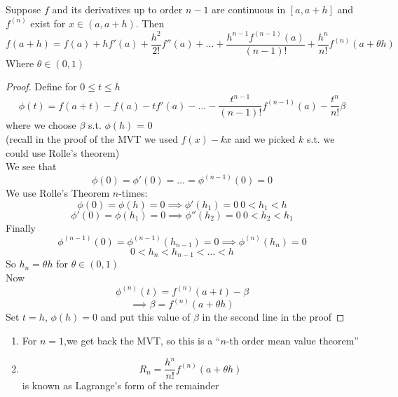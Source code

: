 \begin{theorem}
Suppose $f$ and its derivatives up to order $n-1$ are continuous in $[a,a+h]$ and $f^{(n)}$ exist for $x\in (a,a+h)$. Then
\[f(a+h) = f(a) + hf'(a) + \frac{h^2}{2!}f''(a) + \dots + \frac{h^{n-1}f^{(n-1)}(a)}{(n-1)!} + \frac{h^n}{n!}f^{(n)}(a+\theta h)\]
Where $\theta \in (0,1)$
\begin{proof}
Define for $0\leq t\leq h$
\[\phi(t) = f(a+t) - f(a)-tf'(a)-\dots - \frac{t^{n-1}}{(n-1)!}f^{(n-1)}(a) - \frac{t^n}{n!}\beta\]
where we choose $\beta$ s.t. $\phi(h)$ = 0\\
(recall in the proof of the MVT we used $f(x) - kx$ and we picked $k$ s.t. we could use Rolle's theorem)\\
We see that
\[\phi(0) = \phi'(0) = \dots = \phi^{(n-1)}(0) = 0\]
We use Rolle's Theorem $n$-times:
\[\phi(0) = \phi(h) = 0 \implies\phi'(h_1) = 0 \ 0<h_1<h\]
\[\phi'(0) = \phi(h_1) = 0 \implies\phi''(h_2) = 0 \ 0<h_2<h_1\]
Finally
\[\phi^{(n-1)}(0) = \phi^{(n-1)}(h_{n-1}) = 0 \implies \phi^{(n)}(h_n) = 0\]
\[0<h_n<h_{n-1}<\dots<h\]
So $h_n = \theta h$ for $\theta \in (0,1)$\\
Now
\[\phi^{(n)}(t) = f^{(n)}(a+t) - \beta\]
\[\implies \beta = f^{(n)}(a+\theta h)\]
Set $t=h$, $\phi(h) = 0$ and put this value of $\beta$ in the second line in the proof
\end{proof}
\begin{note}
\hfill{ }
\begin{enumerate}
    \item For $n=1$,we get back the MVT, so this is a ``$n$-th order mean value theorem''
    \item \[R_n = \frac{h^n}{n!}f^{(n)}(a+\theta h)\] is known as Lagrange's form of the remainder
\end{enumerate}
\end{note}
\end{theorem}
